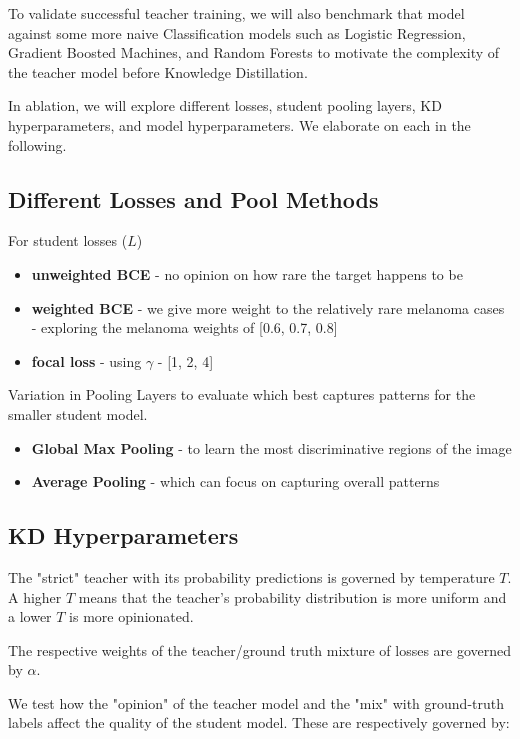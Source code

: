 \documentclass[conference]{IEEEtran}
\begin{document}
To validate successful teacher training, we will also benchmark that model against some more naive Classification models such as Logistic Regression, Gradient Boosted Machines, and Random Forests to motivate the complexity of the teacher model before Knowledge Distillation.

In ablation, we will explore different losses, student pooling layers, KD hyperparameters, and model hyperparameters. We elaborate on each in the following.

\subsection*{Different Losses and Pool Methods}

For student losses ($L$)

\begin{itemize} 
    \item \textbf{unweighted BCE} - no opinion on how rare the target happens to be
    \item \textbf{weighted BCE} - we give more weight to the relatively rare melanoma cases - exploring the melanoma weights of [0.6, 0.7, 0.8]
    \item \textbf{focal loss} - using $\gamma$ - [1, 2, 4]
\end{itemize}

Variation in Pooling Layers to evaluate which best captures patterns for the smaller student model.

   \begin{itemize}
    \item \textbf{Global Max Pooling} - to learn the most discriminative regions of the image
    \item \textbf{Average Pooling} - which can focus on capturing overall patterns
\end{itemize}

\subsection*{KD Hyperparameters}

The "strict" teacher with its probability predictions is governed by temperature $T$. A higher $T$ means that the teacher's probability distribution is more uniform and a lower $T$ is more opinionated. \cite{PytorchKD}

The respective weights of the teacher/ground truth mixture of losses are governed by $\alpha$. \cite{PytorchKD}

We test how the "opinion" of the teacher model and the "mix" with ground-truth labels affect the quality of the student model. These are respectively governed by:
\end{document}

